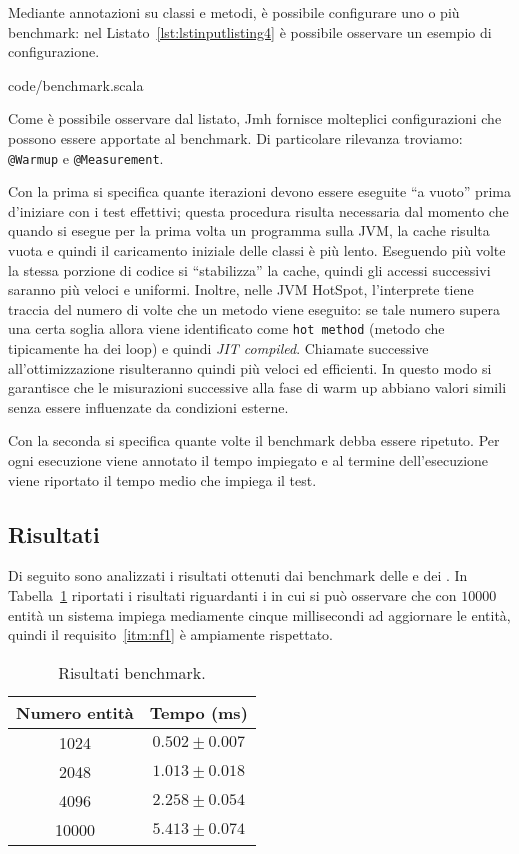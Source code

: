 Mediante annotazioni su classi e metodi, è possibile configurare uno o più benchmark: nel
Listato~\ref{lst:lstinputlisting4} è possibile osservare un esempio di configurazione.


{code/benchmark.scala}

Come è possibile osservare dal listato, Jmh fornisce molteplici configurazioni che possono essere apportate al
benchmark.
Di particolare rilevanza troviamo: \texttt{@Warmup} e \texttt{@Measurement}.

Con la prima si specifica quante iterazioni devono essere eseguite ``a vuoto'' prima d'iniziare con i test effettivi;
questa procedura risulta necessaria dal momento che quando si esegue per la prima volta un programma sulla JVM, la cache
risulta vuota e quindi il caricamento iniziale delle classi è più lento.
Eseguendo più volte la stessa porzione di codice si ``stabilizza'' la cache, quindi gli accessi successivi saranno più
veloci e uniformi.
Inoltre, nelle JVM HotSpot, l'interprete tiene traccia del numero di volte che un metodo viene eseguito: se tale
numero supera una certa soglia allora viene identificato come \texttt{hot method} (metodo che tipicamente ha dei
loop) e quindi \textit{JIT compiled}.
Chiamate successive all'ottimizzazione risulteranno quindi più veloci ed efficienti.
In questo modo si garantisce che le misurazioni successive alla fase di warm up abbiano valori simili senza essere
influenzate da condizioni esterne.

Con la seconda si specifica quante volte il benchmark debba essere ripetuto.
Per ogni esecuzione viene annotato il tempo impiegato e al termine dell'esecuzione viene riportato il tempo medio che
impiega il test.

\subsection{Risultati}\label{subsec:risultati}
Di seguito sono analizzati i risultati ottenuti dai benchmark delle \View e dei \System.
In Tabella~\ref{tab:benchmark} riportati i risultati riguardanti i \System in cui si può osservare che con $10000$
entità un sistema impiega mediamente cinque millisecondi ad aggiornare le entità, quindi il requisito~\ref{itm:nf1} è
ampiamente rispettato.

\begin{table}[H]
    \centering
    \begin{tabular}{c c}
        \toprule
        Numero entità & Tempo (ms) \\ \midrule
        1024  & $0.502 \pm 0.007$ \\
        2048  & $1.013 \pm 0.018$ \\
        4096  & $2.258 \pm 0.054$ \\
        10000 & $5.413 \pm 0.074$ \\
        \bottomrule
    \end{tabular}
    \caption{\label{tab:benchmark}Risultati benchmark.}
\end{table}

